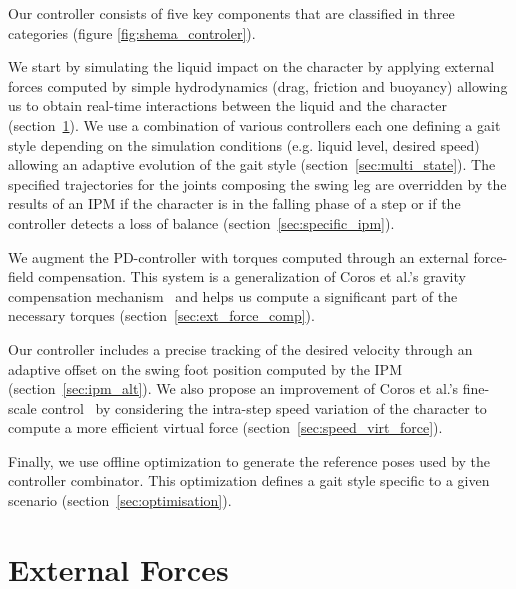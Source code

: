 \documentclass[conference]{acmsiggraph}
\begin{document}
Our controller consists of five key components that are classified in three categories (figure \ref{fig:shema_controler}).

We start by simulating the liquid impact on the character by applying external forces computed by simple hydrodynamics (drag, friction and buoyancy) allowing us to obtain real-time interactions between the liquid and the character (section~\ref{sec:ext_forces}).
We use a combination of various controllers each one defining a gait style depending on the simulation conditions (e.g. liquid level, desired speed) allowing an adaptive evolution of the gait style (section~\ref{sec:multi_state}). The specified trajectories for the joints composing the swing leg are overridden by the results of an IPM if the character is in the falling phase of a step or if the controller detects a loss of balance (section~\ref{sec:specific_ipm}).

We augment the PD-controller with torques computed through an external force-field compensation. This system is a generalization of Coros et al.'s gravity compensation mechanism~\cite{coros2010generalized} and helps us compute a significant part of the necessary torques (section~\ref{sec:ext_force_comp}).

Our controller includes a precise tracking of the desired velocity through an adaptive offset on the swing foot position computed by the IPM (section~\ref{sec:ipm_alt}). We also propose an improvement of Coros et al.'s fine-scale control~\cite{coros2010generalized} by considering the intra-step speed variation of the character to compute a more efficient virtual force (section~\ref{sec:speed_virt_force}).

Finally, we use offline optimization to generate the reference poses used by the controller combinator. This optimization defines a gait style specific to a given scenario (section~\ref{sec:optimisation}).

\section{External Forces}
\label{sec:ext_forces}
\end{document}
